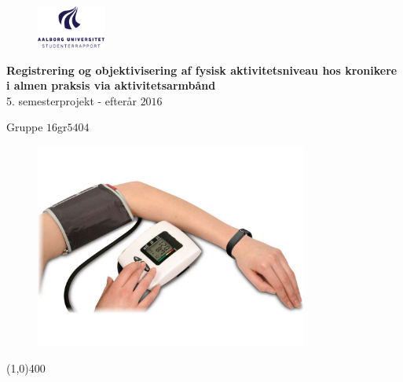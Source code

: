 \clearpage
\thispagestyle{empty}

\begin{figure}[H]
	\raggedleft
		\includegraphics[width=0.2\textwidth]{figures/aaulogo-da.png}
\end{figure} 
\vspace*{\fill} 
\begin{center}
\begin{Huge}
\textbf{Registrering og objektivisering af fysisk aktivitetsniveau hos kronikere i almen praksis via aktivitetsarmbånd}\\
\vspace{5 mm}
5. semesterprojekt - efterår $2016$\\
\vspace{3 mm}
\end{Huge}
{\Large Gruppe $16$gr$5404$}
\begin{figure}[H]
	\centering
	\includegraphics[width=0.8\textwidth]{figures/forside}
\end{figure}	
\end{center}
\vspace*{\fill}

\begin{center}
\line(1,0){400}
\end{center}